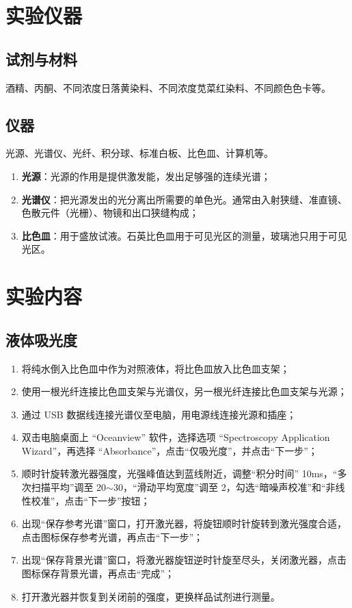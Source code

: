 \section{实验仪器}

\subsection{试剂与材料}
酒精、丙酮、不同浓度日落黄染料、不同浓度苋菜红染料、不同颜色色卡等。

\subsection{仪器}
光源、光谱仪、光纤、积分球、标准白板、比色皿、计算机等。
\begin{enumerate}[label=\arabic*、, leftmargin=4em, labelsep=0pt]
    \item \textbf{光源}：光源的作用是提供激发能，发出足够强的连续光谱；
    \item \textbf{光谱仪}：把光源发出的光分离出所需要的单色光。通常由入射狭缝、准直镜、色散元件（光栅）、物镜和出口狭缝构成；
    \item \textbf{比色皿}：用于盛放试液。石英比色皿用于可见光区的测量，玻璃池只用于可见光区。
\end{enumerate}

\section{实验内容}

\subsection{液体吸光度}
\begin{enumerate}[label=\arabic*、, leftmargin=4em, labelsep=0pt]
    \item 将纯水倒入比色皿中作为对照液体，将比色皿放入比色皿支架；
    \item 使用一根光纤连接比色皿支架与光谱仪，另一根光纤连接比色皿支架与光源；
    \item 通过 USB 数据线连接光谱仪至电脑，用电源线连接光源和插座；
    \item 双击电脑桌面上 ``Oceanview'' 软件，选择选项 ``Spectroscopy Application Wizard''，再选择 ``Absorbance''，点击``仅吸光度''，并点击``下一步''；
    \item 顺时针旋转激光器强度，光强峰值达到蓝线附近，调整``积分时间'' 10ms，``多次扫描平均''调至 20$\sim$30，``滑动平均宽度''调至 2，勾选``暗噪声校准''和``非线性校准''，点击``下一步''按钮；
    \item 出现``保存参考光谱''窗口，打开激光器，将旋钮顺时针旋转到激光强度合适，点击图标保存参考光谱，再点击``下一步''；
    \item 出现``保存背景光谱''窗口，将激光器旋钮逆时针旋至尽头，关闭激光器，点击图标保存背景光谱，再点击``完成''；
    \item 打开激光器并恢复到关闭前的强度，更换样品试剂进行测量。
\end{enumerate}

